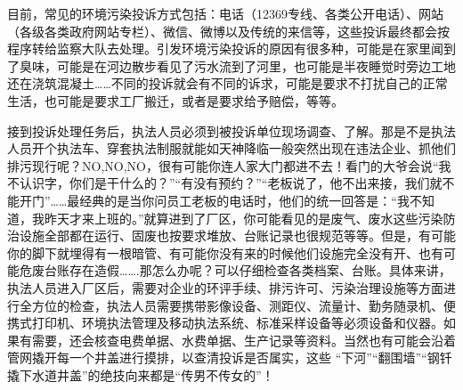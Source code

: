 \documentclass[]{book}
\begin{document}
目前，常见的环境污染投诉方式包括：电话（12369专线、各类公开电话）、网站（各级各类政府网站专栏）、微信、微博以及传统的来信等，这些投诉最终都会按程序转给监察大队去处理。引发环境污染投诉的原因有很多种，可能是在家里闻到了臭味，可能是在河边散步看见了污水流到了河里，也可能是半夜睡觉时旁边工地还在浇筑混凝土\ldots{}\ldots{}不同的投诉就会有不同的诉求，可能是要求不打扰自己的正常生活，也可能是要求工厂搬迁，或者是要求给予赔偿，等等。

接到投诉处理任务后，执法人员必须到被投诉单位现场调查、了解。那是不是执法人员开个执法车、穿套执法制服就能如天神降临一般突然出现在违法企业、抓他们排污现行呢？NO,NO,NO，很有可能你连人家大门都进不去！看门的大爷会说``我不认识字，你们是干什么的？''``有没有预约？''``老板说了，他不出来接，我们就不能开门''\ldots{}\ldots{}最经典的是当你问员工老板的电话时，他们的统一回答是：``我不知道，我昨天才来上班的。''就算进到了厂区，你可能看见的是废气、废水这些污染防治设施全部都在运行、固废也按要求堆放、台账记录也很规范等等。但是，有可能你的脚下就埋得有一根暗管、有可能你没有来的时候他们设施完全没有开、也有可能危废台账存在造假\ldots{}\ldots{}.那怎么办呢？可以仔细检查各类档案、台账。具体来讲，执法人员进入厂区后，需要对企业的环评手续、排污许可、污染治理设施等方面进行全方位的检查，执法人员需要携带影像设备、测距仪、流量计、勤务随录机、便携式打印机、环境执法管理及移动执法系统、标准采样设备等必须设备和仪器。如果有需要，还会核查电费单据、水费单据、生产记录等资料。当然也有可能会沿着管网撬开每一个井盖进行摸排，以查清投诉是否属实，这些 ``下河''``翻围墙''``钢钎撬下水道井盖''的绝技向来都是``传男不传女的''！
\end{document}

